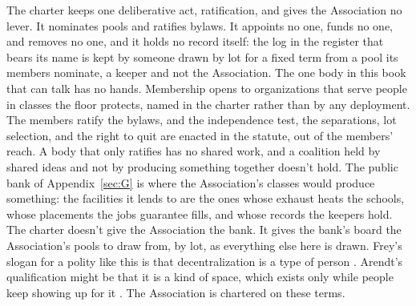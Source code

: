 The charter keeps one deliberative act, ratification, and gives the Association no lever. It nominates pools and ratifies bylaws. It appoints no one, funds no one, and removes no one, and it holds no record itself: the log in the register that bears its name is kept by someone drawn by lot for a fixed term from a pool its members nominate, a keeper and not the Association. The one body in this book that can talk has no hands. Membership opens to organizations that serve people in classes the floor protects, named in the charter rather than by any deployment. The members ratify the bylaws, and the independence test, the separations, lot selection, and the right to quit are enacted in the statute, out of the members' reach.
A body that only ratifies has no shared work, and a coalition held by shared ideas and not by producing something together doesn't hold. The public bank of Appendix~\ref{sec:G} is where the Association's classes would produce something: the facilities it lends to are the ones whose exhaust heats the schools, whose placements the jobs guarantee fills, and whose records the keepers hold. The charter doesn't give the Association the bank. It gives the bank's board the Association's pools to draw from, by lot, as everything else here is drawn. Frey's slogan for a polity like this is that decentralization is a type of person \autocite{frey2026decentralization}. Arendt's qualification might be that it is a kind of space, which exists only while people keep showing up for it \autocite{arendt1958human}. The Association is chartered on these terms.

